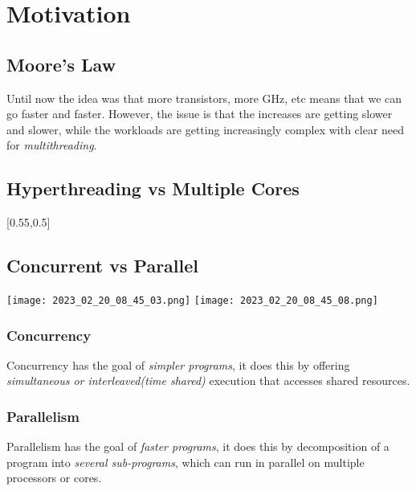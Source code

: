 \documentclass[main.tex,fontsize=8pt,paper=a4,paper=portrait,DIV=calc,]{scrartcl}
\begin{document}
\centering
\tableofcontents

\lstset{
    language=Java,
    style=code,
}

\newcommand{\TITLE}{Parallel Programming}
\newcommand{\AUTHOR}{Fabio Lenherr}
\setcounter{tocdepth}{1}

\section{Motivation}

\subsection{Moore's Law}
Until now the idea was that more transistors, more GHz, etc means that we can go faster and faster.
However, the issue is that the increases are getting slower and slower, while the workloads are getting increasingly complex with clear need for \emph{multithreading}.

\subsection{Hyperthreading vs Multiple Cores}
[0.55,0.5]

\subsection{Concurrent vs Parallel}
\texttt{[image: 2023\_02\_20\_08\_45\_03.png]}
\texttt{[image: 2023\_02\_20\_08\_45\_08.png]}

\subsubsection{Concurrency}
Concurrency has the goal of \emph{simpler programs}, it does this by offering \emph{simultaneous or interleaved(time shared)} execution that accesses shared resources. 

\subsubsection{Parallelism}
Parallelism has the goal of \emph{faster programs}, it does this by decomposition of a program into \emph{several sub-programs}, which can run in parallel on multiple processors or cores.
\end{document}
